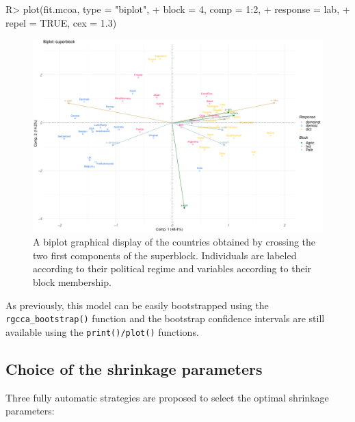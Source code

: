 \documentclass[
]{jss}
\begin{document}
\begin{CodeChunk}
\begin{CodeInput}
R> plot(fit.mcoa, type = "biplot", 
+      block = 4, comp = 1:2, 
+      response = lab, 
+      repel = TRUE, cex = 1.3)
\end{CodeInput}
\begin{figure}

{\centering \includegraphics{RGCCA_vignette_files/figure-latex/unnamed-chunk-17-1} 

}

\caption[A biplot graphical display of the countries obtained by crossing the two first components of the superblock]{A biplot graphical display of the countries obtained by crossing the two first components of the superblock. Individuals are labeled according to their political regime and variables according to their block membership.}\label{fig:unnamed-chunk-17}
\end{figure}
\end{CodeChunk}

\normalsize

As previously, this model can be easily bootstrapped using the
\texttt{rgcca\_bootstrap()} function and the bootstrap confidence
intervals are still available using the \texttt{print()/plot()}
functions.

\hypertarget{choice-of-the-shrinkage-parameters}{%
\subsection{Choice of the shrinkage
parameters}\label{choice-of-the-shrinkage-parameters}}

Three fully automatic strategies are proposed to select the optimal
shrinkage parameters:
\end{document}
